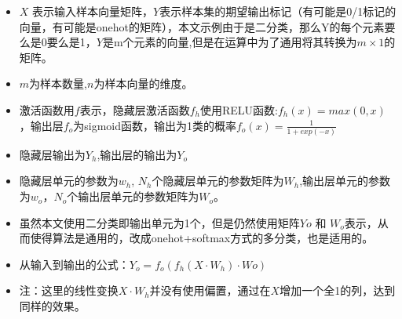\documentclass[12pt, a4paper, oneside]{ctexart}
\begin{document}
\begin{itemize}
\item $X$ 表示输入样本向量矩阵，$Y$表示样本集的期望输出标记（有可能是0/1标记的向量，有可能是onehot的矩阵），本文示例由于是二分类，那么Y的每个元素要么是0要么是1，$Y$是m个元素的向量,但是在运算中为了通用将其转换为$m\times 1$的矩阵。
\item $m$为样本数量,$n$为样本向量的维度。
\item 激活函数用$f$表示，隐藏层激活函数$f_h$使用RELU函数:$f_h(x) = max(0, x)$，输出层$f_o$为sigmoid函数，输出为1类的概率$f_o(x) = \frac{1}{1+exp(-x)}$
\item 隐藏层输出为$Y_h$,输出层的输出为$Y_o$
\item 隐藏层单元的参数为$w_h$, $N_h$个隐藏层单元的参数矩阵为$W_h$,输出层单元的参数为$w_o$，$N_o$个输出层单元的参数矩阵为$W_o$。
\item 虽然本文使用二分类即输出单元为1个，但是仍然使用矩阵$Yo $ 和 $ W_o$表示，从而使得算法是通用的，改成onehot+softmax方式的多分类，也是适用的。
\item 从输入到输出的公式：$Y_o = f_o(f_h(X \cdot W_h) \cdot Wo)$
\item 注：这里的线性变换$X \cdot W_h$并没有使用偏置，通过在$X$增加一个全1的列，达到同样的效果。
\end{itemize}
\end{document}
